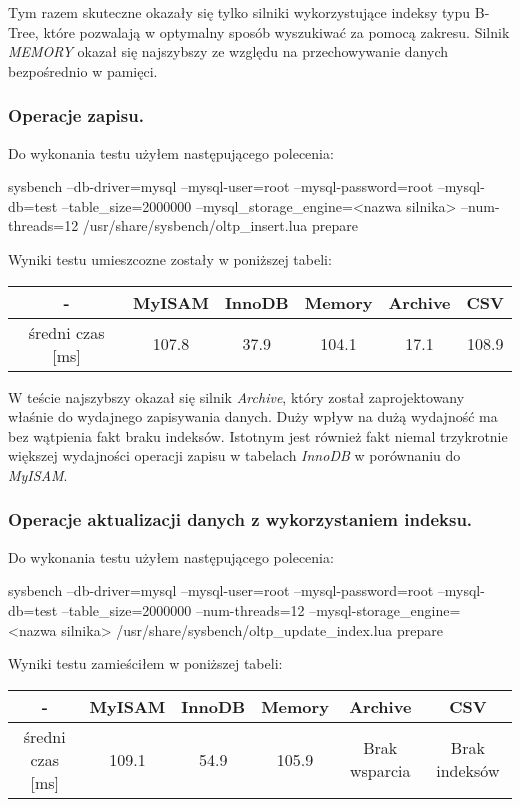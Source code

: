 Tym razem skuteczne okazały się tylko silniki wykorzystujące indeksy typu B-Tree, które pozwalają w optymalny sposób wyszukiwać za pomocą zakresu. Silnik \textit{MEMORY} okazał się najszybszy ze względu na przechowywanie danych bezpośrednio w pamięci.

\subsubsection{Operacje zapisu.}

Do wykonania testu użyłem następującego polecenia:
\begin{spverbatim}
	 sysbench --db-driver=mysql --mysql-user=root --mysql-password=root --mysql-db=test --table_size=2000000 --mysql_storage_engine=<nazwa silnika> --num-threads=12 /usr/share/sysbench/oltp_insert.lua prepare
\end{spverbatim}

Wyniki testu umieszcozne zostały w poniższej tabeli:
\begin{center}
	\begin{tabular}{ | c | c | c | c | c | c |}
		\hline
		- & MyISAM & InnoDB & Memory & Archive & CSV  \\ 
		\hline
		średni czas [ms] & 107.8 & 37.9 & 104.1 & 17.1 & 108.9 \\
		\hline
	\end{tabular}
\end{center}

W teście najszybszy okazał się silnik \textit{Archive}, który został zaprojektowany właśnie do wydajnego zapisywania danych. Duży wpływ na dużą wydajność ma bez wątpienia fakt braku indeksów. Istotnym jest również fakt niemal trzykrotnie większej wydajności operacji zapisu w tabelach \textit{InnoDB} w porównaniu do \textit{MyISAM}.

\subsubsection{Operacje aktualizacji danych z wykorzystaniem indeksu.}

Do wykonania testu użyłem następującego polecenia:
\begin{spverbatim}
	sysbench --db-driver=mysql --mysql-user=root --mysql-password=root --mysql-db=test --table_size=2000000 --num-threads=12 --mysql-storage_engine=
	<nazwa silnika> /usr/share/sysbench/oltp_update_index.lua prepare
\end{spverbatim}

Wyniki testu zamieściłem w poniższej tabeli:
\begin{center}
	\begin{tabular}{ | c | c | c | c | c | c |}
		\hline
		- & MyISAM & InnoDB & Memory & Archive & CSV  \\ 
		\hline
		średni czas [ms] & 109.1 & 54.9 & 105.9 & Brak wsparcia & Brak indeksów \\
		\hline
	\end{tabular}
\end{center}


